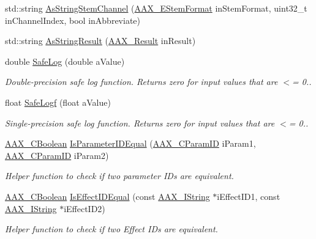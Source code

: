 \begin{DoxyCompactItemize}
\item 
std\+::string \hyperlink{a00288_adfab6bf193c09266ecec2069b8da0c5c}{As\+String\+Stem\+Channel} (\hyperlink{a00206_ad8af5ef008b2bd478add9a0acb0a1d85}{A\+A\+X\+\_\+\+E\+Stem\+Format} in\+Stem\+Format, uint32\+\_\+t in\+Channel\+Index, bool in\+Abbreviate)
\item 
std\+::string \hyperlink{a00288_a354029650cebc5f23636c9984a65ea0d}{As\+String\+Result} (\hyperlink{a00149_a4d8f69a697df7f70c3a8e9b8ee130d2f}{A\+A\+X\+\_\+\+Result} in\+Result)
\item 
double \hyperlink{a00288_ae8de30637f08cd29bb0e27526ce9e21b}{Safe\+Log} (double a\+Value)
\begin{DoxyCompactList}\small\item\em Double-\/precision safe log function. Returns zero for input values that are $<$= 0.. \end{DoxyCompactList}\item 
float \hyperlink{a00288_ad762727aac31ad8b7bba8b67a4bc2edc}{Safe\+Logf} (float a\+Value)
\begin{DoxyCompactList}\small\item\em Single-\/precision safe log function. Returns zero for input values that are $<$= 0.. \end{DoxyCompactList}\item 
\hyperlink{a00149_aa216506530f1d19a2965931ced2b274b}{A\+A\+X\+\_\+\+C\+Boolean} \hyperlink{a00288_ae4d1a0a925aa954899fec653dc041b75}{Is\+Parameter\+I\+D\+Equal} (\hyperlink{a00149_a1440c756fe5cb158b78193b2fc1780d1}{A\+A\+X\+\_\+\+C\+Param\+I\+D} i\+Param1, \hyperlink{a00149_a1440c756fe5cb158b78193b2fc1780d1}{A\+A\+X\+\_\+\+C\+Param\+I\+D} i\+Param2)
\begin{DoxyCompactList}\small\item\em Helper function to check if two parameter I\+Ds are equivalent. \end{DoxyCompactList}\item 
\hyperlink{a00149_aa216506530f1d19a2965931ced2b274b}{A\+A\+X\+\_\+\+C\+Boolean} \hyperlink{a00288_aef81989128dcac01f2be8fd25096540f}{Is\+Effect\+I\+D\+Equal} (const \hyperlink{a00113}{A\+A\+X\+\_\+\+I\+String} $\ast$i\+Effect\+I\+D1, const \hyperlink{a00113}{A\+A\+X\+\_\+\+I\+String} $\ast$i\+Effect\+I\+D2)
\begin{DoxyCompactList}\small\item\em Helper function to check if two Effect I\+Ds are equivalent. \end{DoxyCompactList}\item 

\end{DoxyCompactItemize}
